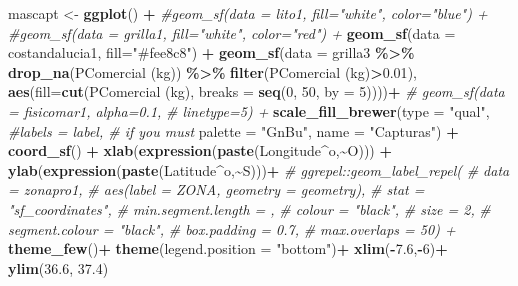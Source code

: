 \documentclass[
]{article}
\newenvironment{Shaded}{\begin{snugshade}}{\end{snugshade}}
\newcommand{\AttributeTok}[1]{\textcolor[rgb]{0.13,0.29,0.53}{#1}}
\newcommand{\CommentTok}[1]{\textcolor[rgb]{0.56,0.35,0.01}{\textit{#1}}}
\newcommand{\DecValTok}[1]{\textcolor[rgb]{0.00,0.00,0.81}{#1}}
\newcommand{\FloatTok}[1]{\textcolor[rgb]{0.00,0.00,0.81}{#1}}
\newcommand{\FunctionTok}[1]{\textcolor[rgb]{0.13,0.29,0.53}{\textbf{#1}}}
\newcommand{\NormalTok}[1]{#1}
\newcommand{\OtherTok}[1]{\textcolor[rgb]{0.56,0.35,0.01}{#1}}
\newcommand{\SpecialCharTok}[1]{\textcolor[rgb]{0.81,0.36,0.00}{\textbf{#1}}}
\newcommand{\StringTok}[1]{\textcolor[rgb]{0.31,0.60,0.02}{#1}}
\begin{document}
\begin{Shaded}
\begin{Highlighting}[]
\NormalTok{mascapt }\OtherTok{\textless{}{-}} \FunctionTok{ggplot}\NormalTok{() }\SpecialCharTok{+}
  \CommentTok{\#geom\_sf(data = lito1, fill="white", color="blue") +}
  \CommentTok{\#geom\_sf(data = grilla1, fill="white", color="red") +}
  \FunctionTok{geom\_sf}\NormalTok{(}\AttributeTok{data =}\NormalTok{ costandalucia1, }\AttributeTok{fill=}\StringTok{"\#fee8c8"}\NormalTok{) }\SpecialCharTok{+}
  \FunctionTok{geom\_sf}\NormalTok{(}\AttributeTok{data =}\NormalTok{ grilla3 }\SpecialCharTok{\%\textgreater{}\%}
            \FunctionTok{drop\_na}\NormalTok{(}\StringTok{\textasciigrave{}}\AttributeTok{PComercial (kg)}\StringTok{\textasciigrave{}}\NormalTok{) }\SpecialCharTok{\%\textgreater{}\%} 
            \FunctionTok{filter}\NormalTok{(}\StringTok{\textasciigrave{}}\AttributeTok{PComercial (kg)}\StringTok{\textasciigrave{}}\SpecialCharTok{\textgreater{}}\FloatTok{0.01}\NormalTok{), }
          \FunctionTok{aes}\NormalTok{(}\AttributeTok{fill=}\FunctionTok{cut}\NormalTok{(}\StringTok{\textasciigrave{}}\AttributeTok{PComercial (kg)}\StringTok{\textasciigrave{}}\NormalTok{,}
                       \AttributeTok{breaks =} \FunctionTok{seq}\NormalTok{(}\DecValTok{0}\NormalTok{, }\DecValTok{50}\NormalTok{, }\AttributeTok{by =} \DecValTok{5}\NormalTok{))))}\SpecialCharTok{+}
  \CommentTok{\# geom\_sf(data = fisicomar1, alpha=0.1,}
  \CommentTok{\#         linetype=5) +}
  \FunctionTok{scale\_fill\_brewer}\NormalTok{(}\AttributeTok{type =} \StringTok{"qual"}\NormalTok{,}
                    \CommentTok{\#labels = label, \# if you must}
                    \AttributeTok{palette =} \StringTok{"GnBu"}\NormalTok{,}
                    \AttributeTok{name =} \StringTok{"Capturas"}\NormalTok{) }\SpecialCharTok{+}
    \FunctionTok{coord\_sf}\NormalTok{() }\SpecialCharTok{+}
  \FunctionTok{xlab}\NormalTok{(}\FunctionTok{expression}\NormalTok{(}\FunctionTok{paste}\NormalTok{(Longitude}\SpecialCharTok{\^{}}\NormalTok{o,}\SpecialCharTok{\textasciitilde{}}\StringTok{\textquotesingle{}O\textquotesingle{}}\NormalTok{))) }\SpecialCharTok{+}
  \FunctionTok{ylab}\NormalTok{(}\FunctionTok{expression}\NormalTok{(}\FunctionTok{paste}\NormalTok{(Latitude}\SpecialCharTok{\^{}}\NormalTok{o,}\SpecialCharTok{\textasciitilde{}}\StringTok{\textquotesingle{}S\textquotesingle{}}\NormalTok{)))}\SpecialCharTok{+}
  \CommentTok{\# ggrepel::geom\_label\_repel(}
  \CommentTok{\#   data = zonapro1,}
  \CommentTok{\#   aes(label = ZONA, geometry = geometry),}
  \CommentTok{\#   stat = "sf\_coordinates",}
  \CommentTok{\#   min.segment.length = ,}
  \CommentTok{\#   colour = "black",}
  \CommentTok{\#   size = 2,}
  \CommentTok{\#   segment.colour = "black",}
  \CommentTok{\#   box.padding = 0.7,}
  \CommentTok{\#   max.overlaps = 50) +}
  \FunctionTok{theme\_few}\NormalTok{()}\SpecialCharTok{+}
  \FunctionTok{theme}\NormalTok{(}\AttributeTok{legend.position =} \StringTok{"bottom"}\NormalTok{)}\SpecialCharTok{+}
  \FunctionTok{xlim}\NormalTok{(}\SpecialCharTok{{-}}\FloatTok{7.6}\NormalTok{,}\SpecialCharTok{{-}}\DecValTok{6}\NormalTok{)}\SpecialCharTok{+}
  \FunctionTok{ylim}\NormalTok{(}\FloatTok{36.6}\NormalTok{, }\FloatTok{37.4}\NormalTok{)}


\end{Highlighting}
\end{Shaded}
\end{document}
